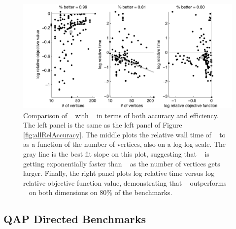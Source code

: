 \documentclass[preprint,11pt]{elsarticle}
\begin{document}
\begin{figure}[htbp]
	\centering
		\includegraphics[width=1.0\linewidth]{../figs/allPathCompare.pdf}
	\caption{Comparison of \FAQ~ with \Path~ in terms of both accuracy and efficiency.  The left panel is the same as the left panel of Figure \ref{fig:allRelAccuracy}.  The middle plots the relative wall time of \FAQ~ to \Path~ as a function of the number of vertices, also on a log-log scale.  The gray line is the best fit slope on this plot, suggesting that \FAQ~ is getting exponentially faster than \Path~ as the number of vertices gets larger.  Finally, the right panel plots log relative time versus log relative objective function value, demonstrating that \FAQ~ outperforms \Path~ on both dimensions on $80\%$ of the benchmarks.}
	\label{fig:tradeoff}
\end{figure}





\subsection{QAP Directed Benchmarks}
\label{sub:directed}
\end{document}

